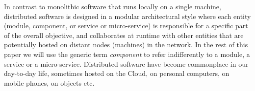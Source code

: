 %


In contrast to monolithic software that runs locally on a single machine, distributed software is designed in a modular architectural style where each entity (\ie module, component, or service or micro-service) is responsible for a specific part of the overall objective, and collaborates at runtime with other entities that are potentially hosted on distant nodes (\ie machines) in the network. In the rest of this paper we will use the generic term \emph{component} to refer indifferently to a module, a service or a micro-service. Distributed software have become commonplace in our day-to-day life, sometimes hosted on the Cloud, on personal computers, on mobile phones, on objects etc. 

